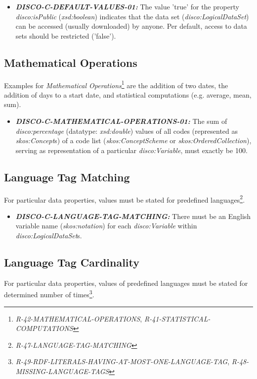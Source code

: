 \documentclass{llncs}
\begin{document}
\begin{itemize}
	\item \textbf{{\em DISCO-C-DEFAULT-VALUES-01:}}
The value 'true' for the property {\em disco:isPublic} ({\em xsd:boolean}) indicates that the data set ({\em disco:LogicalDataSet}) can be accessed (usually downloaded) by anyone.
Per default, access to data sets should be restricted ('false').
\end{itemize}

\subsection{Mathematical Operations}

Examples for {\em Mathematical Operations}\footnote{{\em R-42-MATHEMATICAL-OPERATIONS}, {\em R-41-STATISTICAL-COMPUTATIONS}} are the addition of two dates, the addition of days to a start date, and statistical computations (e.g. average, mean, sum).

\begin{itemize}
	\item \textbf{{\em DISCO-C-MATHEMATICAL-OPERATIONS-01:}}
The sum of {\em disco:percentage} (datatype: {\em xsd:double}) values of all codes (represented as {\em skos:Concept}s) of a code list ({\em skos:ConceptScheme} or {\em skos:OrderedCollection}), serving as representation of a particular {\em disco:Variable}, must exactly be 100.
\end{itemize}

\subsection{Language Tag Matching}

For particular data properties, values must be stated for predefined languages\footnote{{\em R-47-LANGUAGE-TAG-MATCHING}}.

\begin{itemize}
	\item \textbf{{\em DISCO-C-LANGUAGE-TAG-MATCHING:}}
There must be an English variable name ({\em skos:notation}) for each {\em disco:Variable} within {\em disco:LogicalDataSet}s.
\end{itemize}

\subsection{Language Tag Cardinality}

For particular data properties, values of predefined languages must be stated for determined number of times\footnote{{\em R-49-RDF-LITERALS-HAVING-AT-MOST-ONE-LANGUAGE-TAG}, {\em R-48-MISSING-LANGUAGE-TAGS}}.
\end{document}
